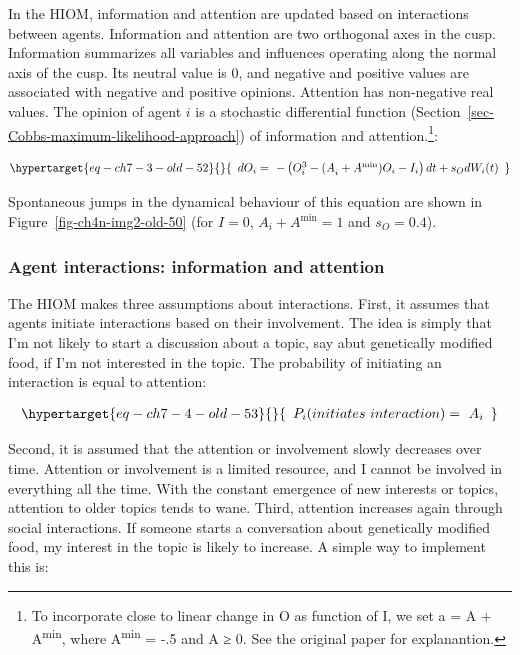 \documentclass[
  a4paper,
  DIV=11,
  numbers=noendperiod,
  oneside]{scrreprt}
\begin{document}
In the HIOM, information and attention are updated based on interactions
between agents. Information and attention are two orthogonal axes in the
cusp. Information summarizes all variables and influences operating
along the normal axis of the cusp. Its neutral value is 0, and negative
and positive values are associated with negative and positive opinions.
Attention has non-negative real values. The opinion of agent \(i\) is a
stochastic differential function
(Section~\ref{sec-Cobbs-maximum-likelihood-approach}) of information and
attention.\footnote{To incorporate close to linear change in O as
  function of I, we set a = A + A\textsuperscript{min}, where
  A\textsuperscript{min} = -.5 and A ≥ 0. See the original paper for
  explanantion.}:

\begin{equation}\protect\hypertarget{eq-ch7-3-old-52}{}{\begin{array}{r}
dO_{i} = \  - \left( O_{i}^{3} - {(A}_{i} + A^{\min})O_{i} - I_{i} \right)dt + s_{O}dW_{i}(t)
\end{array}}\label{eq-ch7-3-old-52}\end{equation}

Spontaneous jumps in the dynamical behaviour of this equation are shown
in Figure~\ref{fig-ch4n-img2-old-50} (for \(I = 0\),
\(A_{i} + A^{\min} = 1\) and \(s_{O} = 0.4\)).

\hypertarget{sec-Agent-interactions-information-and-attention}{%
\subsubsection{Agent interactions: information and
attention}\label{sec-Agent-interactions-information-and-attention}}

The HIOM makes three assumptions about interactions. First, it assumes
that agents initiate interactions based on their involvement. The idea
is simply that I'm not likely to start a discussion about a topic, say
abut genetically modified food, if I'm not interested in the topic. The
probability of initiating an interaction is equal to attention:

\begin{equation}\protect\hypertarget{eq-ch7-4-old-53}{}{\begin{array}{r}
P_{i}(initiates\ interaction) = \ A_{i}
\end{array}}\label{eq-ch7-4-old-53}\end{equation}

Second, it is assumed that the attention or involvement slowly decreases
over time. Attention or involvement is a limited resource, and I cannot
be involved in everything all the time. With the constant emergence of
new interests or topics, attention to older topics tends to wane. Third,
attention increases again through social interactions. If someone starts
a conversation about genetically modified food, my interest in the topic
is likely to increase. A simple way to implement this is:
\end{document}
